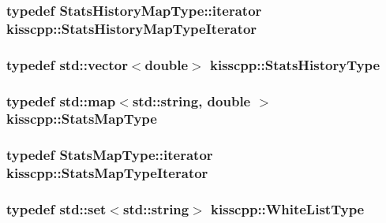 \hypertarget{namespacekisscpp_ae45d7146f3abe3c95364c6ea280f7487}{
\subsubsection[{Stats\-History\-Map\-Type\-Iterator}]{\setlength{\rightskip}{0pt plus 5cm}typedef Stats\-History\-Map\-Type\-::iterator {\bf kisscpp\-::\-Stats\-History\-Map\-Type\-Iterator}}}\label{namespacekisscpp_ae45d7146f3abe3c95364c6ea280f7487}
\hypertarget{namespacekisscpp_a4629097b5a6697a8a1eefd9ac5b0a2b6}{
\subsubsection[{Stats\-History\-Type}]{\setlength{\rightskip}{0pt plus 5cm}typedef std\-::vector$<$double$>$ {\bf kisscpp\-::\-Stats\-History\-Type}}}\label{namespacekisscpp_a4629097b5a6697a8a1eefd9ac5b0a2b6}
\hypertarget{namespacekisscpp_adb9e851c391ea02ff8f961f1cd37ed8c}{
\subsubsection[{Stats\-Map\-Type}]{\setlength{\rightskip}{0pt plus 5cm}typedef std\-::map$<$std\-::string, double $>$ {\bf kisscpp\-::\-Stats\-Map\-Type}}}\label{namespacekisscpp_adb9e851c391ea02ff8f961f1cd37ed8c}
\hypertarget{namespacekisscpp_a674afcb960d0097e39ef66ab83af14be}{
\subsubsection[{Stats\-Map\-Type\-Iterator}]{\setlength{\rightskip}{0pt plus 5cm}typedef Stats\-Map\-Type\-::iterator {\bf kisscpp\-::\-Stats\-Map\-Type\-Iterator}}}\label{namespacekisscpp_a674afcb960d0097e39ef66ab83af14be}
\hypertarget{namespacekisscpp_a6aa00ccbe46e3a892fa90d3fbf6e3439}{
\subsubsection[{White\-List\-Type}]{\setlength{\rightskip}{0pt plus 5cm}typedef std\-::set$<$std\-::string$>$ {\bf kisscpp\-::\-White\-List\-Type}}}\label{namespacekisscpp_a6aa00ccbe46e3a892fa90d3fbf6e3439}


